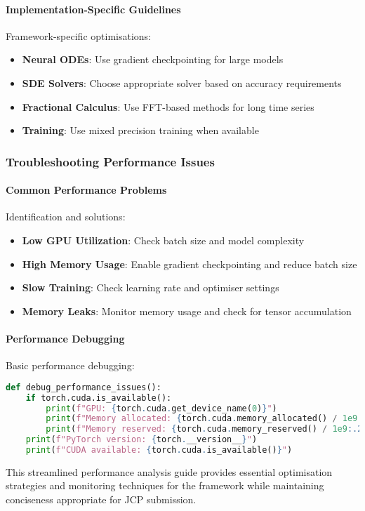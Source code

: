 \paragraph{Implementation-Specific Guidelines}
Framework-specific optimisations:
\begin{itemize}
    \item \textbf{Neural ODEs}: Use gradient checkpointing for large models
    \item \textbf{SDE Solvers}: Choose appropriate solver based on accuracy requirements
    \item \textbf{Fractional Calculus}: Use FFT-based methods for long time series
    \item \textbf{Training}: Use mixed precision training when available
\end{itemize}

\subsubsection{Troubleshooting Performance Issues}

\paragraph{Common Performance Problems}
Identification and solutions:
\begin{itemize}
    \item \textbf{Low GPU Utilization}: Check batch size and model complexity
    \item \textbf{High Memory Usage}: Enable gradient checkpointing and reduce batch size
    \item \textbf{Slow Training}: Check learning rate and optimiser settings
    \item \textbf{Memory Leaks}: Monitor memory usage and check for tensor accumulation
\end{itemize}

\paragraph{Performance Debugging}
Basic performance debugging:

\begin{lstlisting}[language=python, caption=Performance Debugging]
def debug_performance_issues():
    if torch.cuda.is_available():
        print(f"GPU: {torch.cuda.get_device_name(0)}")
        print(f"Memory allocated: {torch.cuda.memory_allocated() / 1e9:.2f} GB")
        print(f"Memory reserved: {torch.cuda.memory_reserved() / 1e9:.2f} GB")
    print(f"PyTorch version: {torch.__version__}")
    print(f"CUDA available: {torch.cuda.is_available()}")
\end{lstlisting}

This streamlined performance analysis guide provides essential optimisation strategies and monitoring techniques for the \hpfracc framework while maintaining conciseness appropriate for JCP submission.